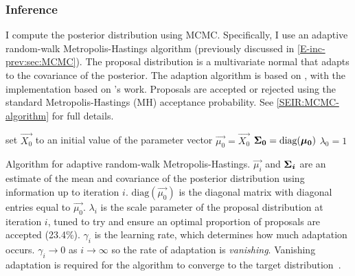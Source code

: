 \documentclass[thesis.tex]{subfiles}
\begin{document}
\subsubsection{Inference} \label{SEIR:sec:inference}

I compute the posterior distribution using MCMC.
Specifically, I use an adaptive random-walk Metropolis-Hastings algorithm (previously discussed in \cref{E-inc-prev:sec:MCMC}).
The proposal distribution is a multivariate normal that adapts to the covariance of the posterior.
The adaption algorithm is based on \textcite[algorithm 4]{andrieuTutorial}, with the implementation based on \textcite{ghoshApproximate}'s work.
Proposals are accepted or rejected using the standard Metropolis-Hastings (MH) acceptance probability.
See \cref{SEIR:MCMC-algorithm} for full details.
\begin{algorithm}
 set $\vec{X_0}$ to an initial value of the parameter vector \;
 $\vec{\mu_0} = \vec{X_0}$ \;
 $\bm{\Sigma_0} = \text{diag}(\bm{\mu_0})$ \;
 $\lambda_0 = 1$ \;
 \caption{Algorithm for adaptive random-walk Metropolis-Hastings. $\vec{\mu_i}$ and $\bm{\Sigma_i}$ are an estimate of the mean and covariance of the posterior distribution using information up to iteration $i$. $\text{diag}(\vec{\mu_0})$ is the diagonal matrix with diagonal entries equal to $\vec{\mu_0}$. $\lambda_i$ is the scale parameter of the proposal distribution at iteration $i$, tuned to try and ensure an optimal proportion of proposals are accepted (23.4\%). $\gamma_i$ is the learning rate, which determines how much adaptation occurs. $\gamma_i \to 0$ as $i \to \infty$ so the rate of adaptation is \emph{vanishing}. Vanishing adaptation is required for the algorithm to converge to the target distribution~\autocite[section 3]{andrieuTutorial}.}
 \label{SEIR:MCMC-algorithm}
\end{algorithm}
\end{document}
